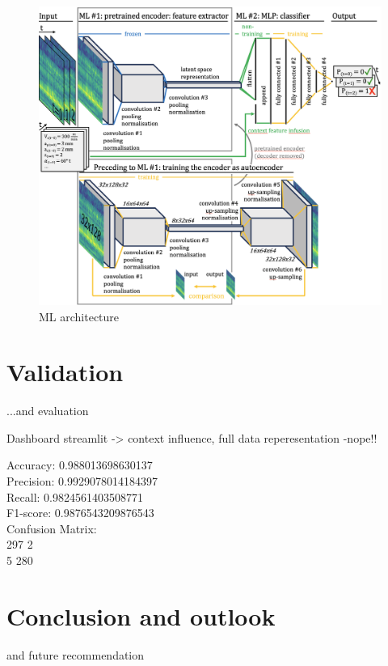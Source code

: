 \documentclass[5p,times,procedia]{elsarticle}
\newenvironment{note}{%
	\noindent
    \color{notecolor}%
}{%
    \par\medskip%
}
\begin{document}
\begin{figure}[t]
    \centering
    \includegraphics[width=0.99\linewidth]{ML_architecture.png}
    \caption{ML architecture}
    \label{ML_architecture}
\end{figure}



 
\section{Validation}
\begin{note}
	...and evaluation
	
	Dashboard streamlit -> context influence, full data reperesentation -nope!!

\end{note}


Accuracy: 0.988013698630137\\
Precision: 0.9929078014184397\\
Recall: 0.9824561403508771\\
F1-score: 0.9876543209876543\\
Confusion Matrix:\\
297   2\\
  5 280\\
 
 
 
\section{Conclusion and outlook}
\begin{note}
	and future recommendation
	
\end{note}
\end{document}
